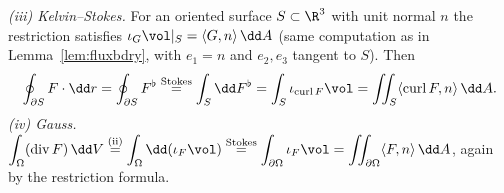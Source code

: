 \emph{(iii) Kelvin--Stokes.} For an oriented surface $S\subset\R^3$ with unit normal $n$ the restriction satisfies $\iota_G\vol|_S=\langle G,n\rangle\,\dd A$ (same computation as in Lemma~\ref{lem:fluxbdry}, with $e_1=n$ and $e_2,e_3$ tangent to $S$). Then
\[
\oint_{\partial S}F\cdot\dd r=\oint_{\partial S}F^\flat\overset{\text{Stokes}}=\int_S\dd F^\flat=\int_S\iota_{\operatorname{curl}F}\vol=\iint_S\langle\operatorname{curl}F,n\rangle\,\dd A .
\]
\emph{(iv) Gauss.} $\displaystyle\int_\Omega(\operatorname{div}F)\,\dd V\overset{\text{(ii)}}=\int_\Omega\dd(\iota_F\vol)\overset{\text{Stokes}}=\int_{\partial\Omega}\iota_F\vol=\iint_{\partial\Omega}\langle F,n\rangle\,\dd A$, again by the restriction formula.
